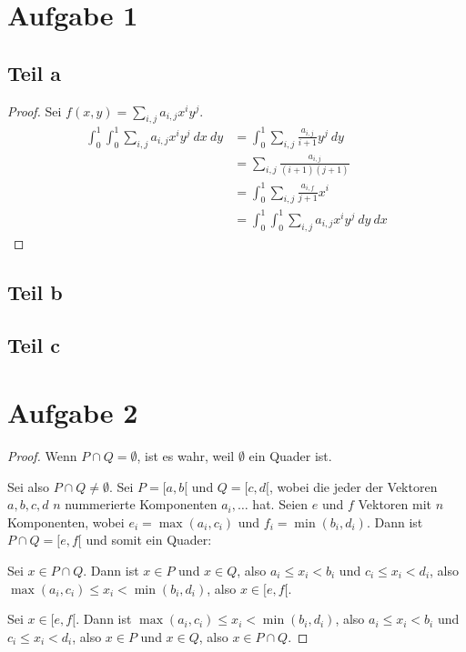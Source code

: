 \documentclass[10pt,a4paper]{article}
\begin{document}
\section{Aufgabe 1}

\subsection{Teil a}
\begin{proof}
  Sei $f(x, y) = \sum_{i, j} a_{i, j} x^{i} y^{j}$.
  \begin{align*}
    \int_{0}^{1} \int_{0}^{1} \sum_{i, j} a_{i, j} x^{i} y^{j}\ dx\ dy & = \int_{0}^{1} \sum_{i, j} \frac{a_{i, j}}{i + 1} y^{j}\ dy\\
    & = \sum_{i, j} \frac{a_{i, j}}{(i + 1)(j + 1)} \\
    & = \int_{0}^{1} \sum_{i, j} \frac{a_{i, f}}{j + 1} x^{i}\\
    & = \int_{0}^{1} \int_{0}^{1} \sum_{i, j} a_{i, j} x^{i} y^{j}\ dy\ dx
  \end{align*}
\end{proof}

\subsection{Teil b}
\subsection{Teil c}

\section{Aufgabe 2}
\begin{proof}
  Wenn $P \cap Q = \emptyset$, ist es wahr, weil $\emptyset$ ein Quader ist.

  Sei also $P \cap Q \ne \emptyset$.
  Sei $P = [a, b[$ und $Q = [c, d[$, wobei die jeder der Vektoren $a, b, c, d$ $n$ nummerierte Komponenten $a_{i}, \dots$ hat.
  Seien $e$ und $f$ Vektoren mit $n$ Komponenten, wobei $e_{i} = \max(a_{i}, c_{i})$ und $f_{i} = \min(b_{i}, d_{i})$.
  Dann ist $P \cap Q = [e, f[$ und somit ein Quader:
  
  Sei $x \in P \cap Q$.
  Dann ist $x \in P$ und $x \in Q$, also $a_{i} \le x_{i} < b_{i}$ und $c_{i} \le x_{i} < d_{i}$, also $\max(a_{i}, c_{i}) \le x_{i} < \min(b_{i}, d_{i})$, also $x \in [e, f[$.
  
  Sei $x \in [e, f[$.
  Dann ist $\max(a_{i}, c_{i}) \le x_{i} < \min(b_{i}, d_{i})$, also $a_{i} \le x_{i} < b_{i}$ und $c_{i} \le x_{i} < d_{i}$, also $x \in P$ und $x \in Q$, also $x \in P \cap Q$.
\end{proof}
\end{document}
